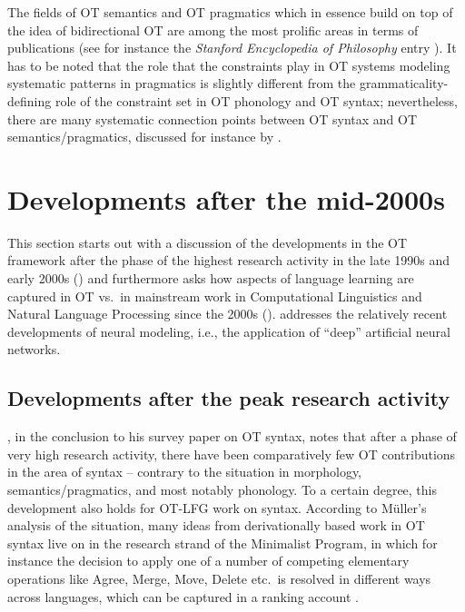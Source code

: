 \documentclass[output=paper,hidelinks]{langscibook}
\begin{document}
The fields of OT semantics and OT pragmatics which in essence build on top of the idea of bidirectional OT are among the most prolific areas in terms of publications (see for instance the \emph{Stanford Encyclopedia of Philosophy} entry \citealt{vanRooijFranke2020}). It has to be noted that the role that the constraints play in OT systems modeling systematic patterns in pragmatics is slightly different from the grammaticality-defining role of the constraint set in OT phonology and OT syntax; nevertheless, there are many systematic connection points between OT syntax and OT semantics/pragmatics, discussed for instance by \citet{BeaverLee2004}.



\section{Developments after the mid-2000s} %
\label{sec:OT:more-recent-developments}

This section starts out with a discussion of the developments in the OT framework after the phase of the highest research activity in the late 1990s and early 2000s () and furthermore asks how aspects of language learning are captured in OT vs.\ in mainstream work in Computational Linguistics and Natural Language Processing since the 2000s ().  addresses the relatively recent developments of neural modeling, i.e., the application of ``deep'' artificial neural networks.

\subsection{Developments after the peak research activity} 
\label{sec:OT:after-peak}


\citet{GMueller2012}, in the conclusion to his survey paper on OT syntax, notes that after a phase of very high research activity, there have been comparatively few OT contributions in the area of syntax -- contrary to the situation in morphology, semantics/pragmatics, and most notably phonology. To a certain degree, this development also holds for OT-LFG work on syntax.  According to M\"uller's analysis of the situation, many ideas from derivationally based work in OT syntax live on in the research strand of the Minimalist Program, in which for instance the decision to apply one of a number of competing elementary operations like Agree, Merge, Move, Delete etc.\ is resolved in different ways across languages, which can be captured in a ranking account \citep[sec.~5]{GMueller2012}.
\end{document}
